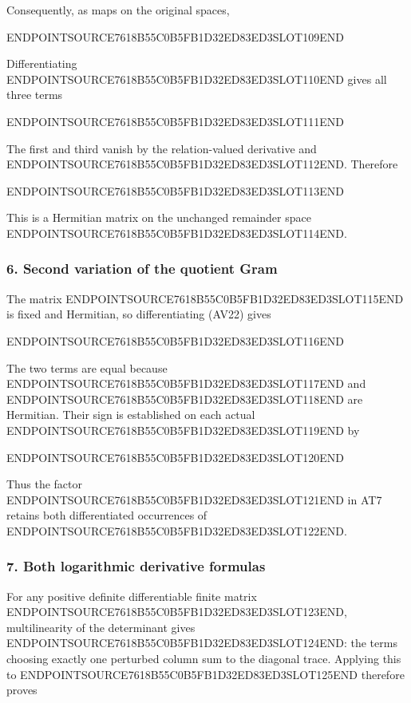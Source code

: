 Consequently, as maps on the original spaces,

ENDPOINTSOURCE7618B55C0B5FB1D32ED83ED3SLOT109END

Differentiating ENDPOINTSOURCE7618B55C0B5FB1D32ED83ED3SLOT110END gives all three terms

ENDPOINTSOURCE7618B55C0B5FB1D32ED83ED3SLOT111END

The first and third vanish by the relation-valued derivative and ENDPOINTSOURCE7618B55C0B5FB1D32ED83ED3SLOT112END. Therefore

ENDPOINTSOURCE7618B55C0B5FB1D32ED83ED3SLOT113END

This is a Hermitian matrix on the unchanged remainder space ENDPOINTSOURCE7618B55C0B5FB1D32ED83ED3SLOT114END.

\subsubsection{6. Second variation of the quotient Gram}\label{endpoint-variation_review--second-variation-of-the-quotient-gram}

The matrix ENDPOINTSOURCE7618B55C0B5FB1D32ED83ED3SLOT115END is fixed and Hermitian, so differentiating (AV22) gives

ENDPOINTSOURCE7618B55C0B5FB1D32ED83ED3SLOT116END

The two terms are equal because ENDPOINTSOURCE7618B55C0B5FB1D32ED83ED3SLOT117END and ENDPOINTSOURCE7618B55C0B5FB1D32ED83ED3SLOT118END are Hermitian. Their sign is established on each actual ENDPOINTSOURCE7618B55C0B5FB1D32ED83ED3SLOT119END by

ENDPOINTSOURCE7618B55C0B5FB1D32ED83ED3SLOT120END

Thus the factor ENDPOINTSOURCE7618B55C0B5FB1D32ED83ED3SLOT121END in AT7 retains both differentiated occurrences of ENDPOINTSOURCE7618B55C0B5FB1D32ED83ED3SLOT122END.

\subsubsection{7. Both logarithmic derivative formulas}\label{endpoint-variation_review--both-logarithmic-derivative-formulas}

For any positive definite differentiable finite matrix ENDPOINTSOURCE7618B55C0B5FB1D32ED83ED3SLOT123END, multilinearity of the determinant gives ENDPOINTSOURCE7618B55C0B5FB1D32ED83ED3SLOT124END: the terms choosing exactly one perturbed column sum to the diagonal trace. Applying this to ENDPOINTSOURCE7618B55C0B5FB1D32ED83ED3SLOT125END therefore proves

